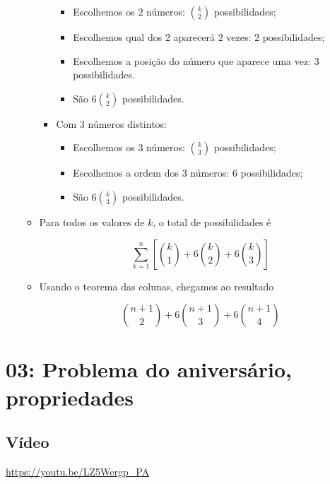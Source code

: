 \documentclass[
  11pt]{report}
\begin{document}
\begin{enumerate}
\begin{itemize}
\begin{itemize}
      \begin{itemize}
      \item
        Escolhemos os $2$ números: $\binom{k}{2}$ possibilidades;
      \item
        Escolhemos qual dos $2$ aparecerá $2$ vezes: $2$ possibilidades;
      \item
        Escolhemos a posição do número que aparece uma vez: $3$ possibilidades.
      \item
        São $6 \binom{k}{2}$ possibilidades.
      \end{itemize}
    \item
      Com $3$ números distintos:

      \begin{itemize}
      \item
        Escolhemos os $3$ números: $\binom{k}{3}$ possibilidades;
      \item
        Escolhemos a ordem dos $3$ números: $6$ possibilidades;
      \item
        São $6 \binom{k}{3}$ possibilidades.
      \end{itemize}
    \end{itemize}
  \item
    Para todos os valores de $k$, o total de possibilidades é

    \[
    \sum_{k = 1}^n \left[ \binom{k}{1} + 6\binom{k}{2} + 6\binom{k}{3}\right]
    \]
  \item
    Usando o teorema das colunas, chegamos ao resultado

    \[
    \binom{n + 1}{2} + 6\binom{n + 1}{3} + 6\binom{n + 1}{4}
    \]
  \end{itemize}
\end{enumerate}

\hypertarget{problema-do-aniversuxe1rio-propriedades}{%
\chapter*{03: Problema do aniversário, propriedades}\label{problema-do-aniversuxe1rio-propriedades}}

\hypertarget{vuxeddeo-2}{%
\section*{Vídeo}\label{vuxeddeo-2}}

\begin{center} \url{https://youtu.be/LZ5Wergp_PA} \end{center}
\end{document}
